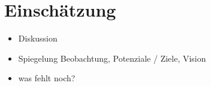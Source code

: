 
\section{Einschätzung}

\begin{itemize}
    \item Diskussion
    \item Spiegelung Beobachtung, Potenziale / Ziele, Vision
    \item was fehlt noch?
\end{itemize}
